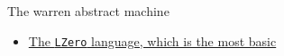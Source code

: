 The warren abstract machine

\begin{itemize}
\tightlist
\item
  \href{lzero.html}{The \texttt{LZero} language, which is the most
  basic}
\end{itemize}

\begin{Shaded}
\begin{Highlighting}[]
  
\end{Highlighting}
\end{Shaded}

\begin{Shaded}
\begin{Highlighting}[]
  \NormalTok{()}
\FunctionTok{=} 
\end{Highlighting}
\end{Shaded}


